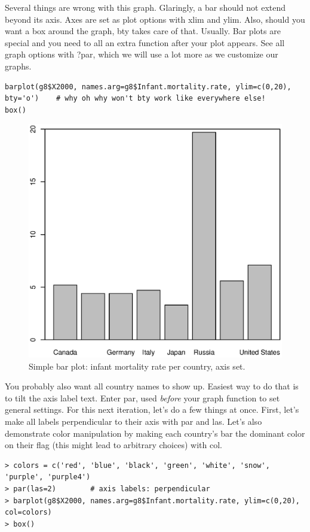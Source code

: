 \documentclass{report}
\newcommand{\code}[1]{\textsf{\ttfamily #1}}
\begin{document}
Several things are wrong with this graph. Glaringly, a bar should not extend beyond its axis. Axes are set as plot options with \code{xlim} and \code{ylim}. Also, should you want a box around the graph, \code{bty} takes care of that. Usually. Bar plots are special and you need to all an extra function after your plot appears. See all graph options with \code{?par}, which we will use a lot more as we customize our graphs.
\begin{verbatim}
barplot(g8$X2000, names.arg=g8$Infant.mortality.rate, ylim=c(0,20), bty='o')	# why oh why won't bty work like everywhere else!
box()
 \end{verbatim}
\begin{figure}[h]
	\centering
	\includegraphics[width=1.0\textwidth]{baraxis.eps}
	\caption{Simple bar plot: infant mortality rate per country, axis set.}
\label{fig:baraxis}
\end{figure}

You probably also want all country names to show up. Easiest way to do that is to tilt the axis label text. Enter \code{par}, used \emph{before} your graph function to set general settings. For this next iteration, let's do a few things at once. First, let's make all labels perpendicular to their axis with \code{par} and \code{las}. Let's also demonstrate color manipulation by making each country's bar the dominant color on their flag (this might lead to arbitrary choices) with \code{col}.
\begin{verbatim}
> colors = c('red', 'blue', 'black', 'green', 'white', 'snow', 'purple', 'purple4')
> par(las=2)		# axis labels: perpendicular
> barplot(g8$X2000, names.arg=g8$Infant.mortality.rate, ylim=c(0,20), col=colors)
> box()
\end{verbatim}
\end{document}
